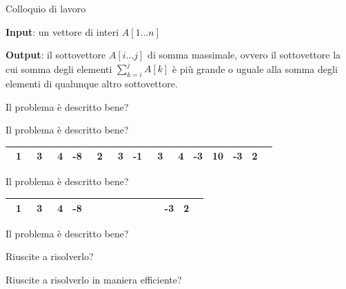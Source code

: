 \begin{frame}[fragile]{Colloquio di lavoro}
	
\vspace{-9pt}
\begin{myboxtitle}
\BI
\item \textbf{Input}: un vettore di interi $A[1 \ldots n]$
\item \textbf{Output}: il sottovettore $A[i \ldots j]$ di somma massimale,
ovvero il sottovettore la cui somma degli elementi $\sum_{k=i}^j A[k]$ è
più grande o uguale alla somma degli elementi di qualunque altro sottovettore.
\EI
\end{myboxtitle}

\begin{overprint}	
\BI
\item Il problema è descritto bene?
\EI

\BI
\item Il problema è descritto bene?
\EI

\bigskip
\begin{center}
\begingroup
\small
\begin{tabular}{|r|r|r|r|r|r|r|r|r|r|r|r|r|r|}
\hline
      ~1 & ~3 & ~4 & -8 & ~{2} & {~3} & {-1} & {~3} & {~4} & {-3} & {10} & -3 &  2 \\\hline
\end{tabular}
\endgroup
\end{center}


\BI
\item Il problema è descritto bene?
\EI

\bigskip
\begin{center}
\begingroup
\small
\begin{tabular}{|r|r|r|r|r|r|r|r|r|r|r|r|r|r|}
\hline
       ~1 & ~3 & ~4 & -8 & ~\cellcolor{red!30}{2} & \cellcolor{red!30}{~3} & \cellcolor{red!30}{-1} & \cellcolor{red!30}{~3} & \cellcolor{red!30}{~4} & \cellcolor{red!30}{-3} & \cellcolor{red!30}{10} & -3 &  2 \\\hline
\end{tabular}
\endgroup
\end{center}

\BI
\item Il problema è descritto bene?
\item Riuscite a risolverlo?
\item Riuscite a risolverlo in maniera efficiente?
\EI

\end{overprint}

\end{frame}

